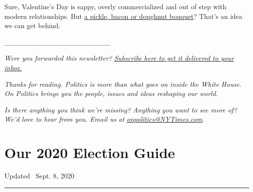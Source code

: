Sure, Valentine's Day is sappy, overly commercialized and out of step
with modern relationships. But
\href{https://www.usatoday.com/story/money/2019/02/06/valentines-days-bouquets-get-wacky-bacon-beef-jerky-pickles/2773987002/}{a
pickle, bacon or doughnut bouquet}? That's an idea we can get behind.

\emph{\_\_\_\_\_\_\_\_\_\_\_\_\_\_\_\_\_\_\_\_\_}

\emph{Were you forwarded this newsletter?}
\href{https://www.nytimes3xbfgragh.onion/newsletters/politics}{\emph{Subscribe
here to get it delivered to your inbox.}}

\emph{Thanks for reading. Politics is more than what goes on inside the
White House. On Politics brings you the people, issues and ideas
reshaping our world.}

\emph{Is there anything you think we're missing? Anything you want to
see more of? We'd love to hear from you. Email us at}
\href{mailto:onpolitics@NYTimes.com}{\emph{onpolitics@NYTimes.com}}\emph{.}

\hypertarget{our-2020-election-guide}{%
\section{Our 2020 Election Guide}\label{our-2020-election-guide}}

Updated ~Sept. 8, 2020

\begin{center}\rule{0.5\linewidth}{\linethickness}\end{center}

